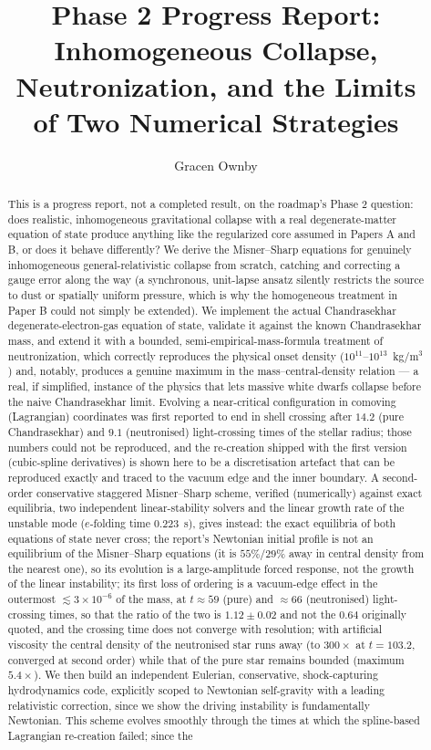 \documentclass[11pt]{article}
\title{Phase 2 Progress Report:\\
Inhomogeneous Collapse, Neutronization, and the Limits\\
of Two Numerical Strategies}
\author{Gracen Ownby}
\date{}
\begin{document}
\maketitle

\begin{abstract}
This is a progress report, not a completed result, on the roadmap's Phase 2 question: does realistic, inhomogeneous gravitational collapse with a real degenerate-matter equation of state produce anything like the regularized core assumed in Papers A and B, or does it behave differently? We derive the Misner--Sharp equations for genuinely inhomogeneous general-relativistic collapse from scratch, catching and correcting a gauge error along the way (a synchronous, unit-lapse ansatz silently restricts the source to dust or spatially uniform pressure, which is why the homogeneous treatment in Paper B could not simply be extended). We implement the actual Chandrasekhar degenerate-electron-gas equation of state, validate it against the known Chandrasekhar mass, and extend it with a bounded, semi-empirical-mass-formula treatment of neutronization, which correctly reproduces the physical onset density ($10^{11}$--$10^{13}$~kg/m$^3$) and, notably, produces a genuine maximum in the mass--central-density relation --- a real, if simplified, instance of the physics that lets massive white dwarfs collapse before the naive Chandrasekhar limit. Evolving a near-critical configuration in comoving (Lagrangian) coordinates was first reported to end in shell crossing after $14.2$ (pure Chandrasekhar) and $9.1$ (neutronised) light-crossing times of the stellar radius; those numbers could not be reproduced, and the re-creation shipped with the first version (cubic-spline derivatives) is shown here to be a discretisation artefact that can be reproduced exactly and traced to the vacuum edge and the inner boundary. A second-order conservative staggered Misner--Sharp scheme, verified (numerically) against exact equilibria, two independent linear-stability solvers and the linear growth rate of the unstable mode ($e$-folding time $0.223$~s), gives instead: the exact equilibria of both equations of state never cross; the report's Newtonian initial profile is not an equilibrium of the Misner--Sharp equations (it is $55\%$/$29\%$ away in central density from the nearest one), so its evolution is a large-amplitude forced response, not the growth of the linear instability; its first loss of ordering is a vacuum-edge effect in the outermost $\lesssim3\times10^{-6}$ of the mass, at $t\approx59$ (pure) and $\approx66$ (neutronised) light-crossing times, so that the ratio of the two is $1.12\pm0.02$ and not the $0.64$ originally quoted, and the crossing time does not converge with resolution; with artificial viscosity the central density of the neutronised star runs away (to $300\times$ at $t=103.2$, converged at second order) while that of the pure star remains bounded (maximum $5.4\times$). We then build an independent Eulerian, conservative, shock-capturing hydrodynamics code, explicitly scoped to Newtonian self-gravity with a leading relativistic correction, since we show the driving instability is fundamentally Newtonian. This scheme evolves smoothly through the times at which the spline-based Lagrangian re-creation failed; since the 
\end{abstract}
\end{document}
